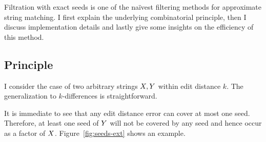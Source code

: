 Filtration with exact seeds is one of the na\"ivest filtering methods for approximate string matching.
I first explain the underlying combinatorial principle, then I discuss implementation details and lastly give some insights on the efficiency of this method.

\subsection{Principle}

I consider the case of two arbitrary strings $X,Y$ within edit distance $k$.
The generalization to $k$-differences is straightforward.

It is immediate to see that any edit distance error can cover at most one seed.
Therefore, at least one seed of $Y$ will not be covered by any seed and hence occur as a factor of $X$.
Figure~\ref{fig:seeds-ext} shows an example.


